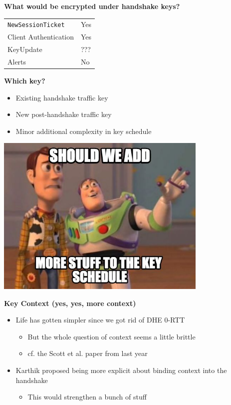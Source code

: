 \documentclass[helvetica]{seminar}
\newcommand{\heading}[1]{%
  \begin{center} 
    \large\bf 
    #1 
  \end{center} 
  \vspace{.4 in}}
\begin{document}
\begin{slide}
\heading{What would be encrypted under handshake keys?}

\begin{tabular}{l l}
\verb^NewSessionTicket^ & Yes \\
Client Authentication & Yes \\
KeyUpdate & ??? \\
Alerts & No \\
\end{tabular}
\end{slide}


\begin{slide}
\heading{Which key?}

\begin{itemize}
\item Existing handshake traffic key
\item New post-handshake traffic key
\item Minor additional complexity in key schedule
\end{itemize}
\end{slide}


\begin{slide}

\includegraphics[width=4in]{851408}

\end{slide}


\begin{slide}
\heading{Key Context (yes, yes, more context)}

\begin{itemize}
\item Life has gotten simpler since we got rid of DHE 0-RTT
  \begin{itemize}
  \item But the whole question of context seems a little brittle
  \item cf. the Scott et al. paper from last year
  \end{itemize}

\item Karthik proposed being more explicit about binding context into the handshake
  \begin{itemize}
  \item This would strengthen a bunch of stuff
  \end{itemize}
\end{itemize}
\end{slide}
\end{document}
